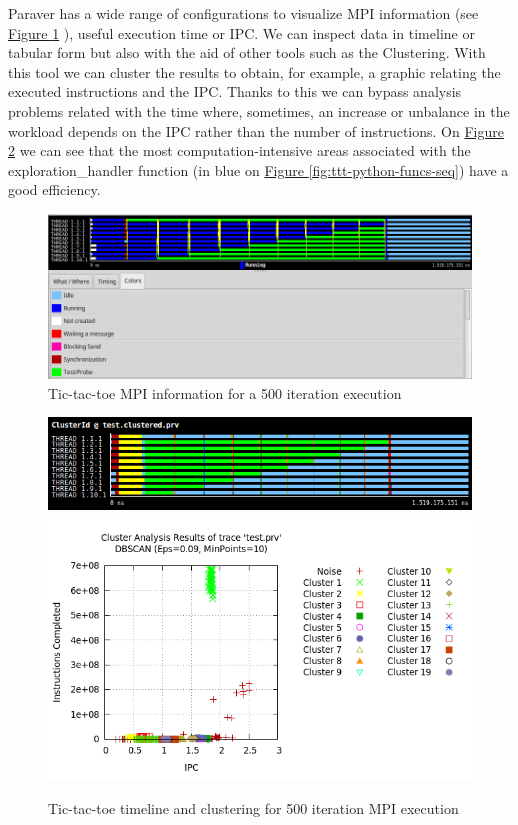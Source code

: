 Paraver has a wide range of configurations to visualize MPI information (see \hyperref[fig:fig:ttt-mpi-IPC]{Figure \ref{fig:ttt-mpi}} ), useful execution time or IPC. We can inspect data in timeline or tabular form but also with the aid of other tools such as the Clustering. With this tool we can cluster the results to obtain, for example, a graphic relating the executed instructions and the IPC. Thanks to this we can bypass analysis problems related with the time where, sometimes, an increase or unbalance in the workload depends on the IPC rather than the number of instructions. On \hyperref[fig:fig:ttt-mpi-IPC]{Figure \ref{fig:ttt-mpi-IPC}} we can see that the most computation-intensive areas associated with the exploration\_handler function (in blue on  \hyperref[fig:ttt-python-funcs-seq]{Figure \ref{fig:ttt-python-funcs-seq}}) have a good efficiency. 
 
 
\begin{figure}[h]
\includegraphics[width=\textwidth]{img/New_window_1_2DZoom_range_[1,6]@test.png}
\caption{Tic-tac-toe MPI information for a 500 iteration execution}
\label{fig:ttt-mpi}
\end{figure}


 
\begin{figure}[h]
\includegraphics[width=\textwidth]{img/cluster_graph_mpi.png}
\includegraphics[width=\textwidth]{img/cluster_mpi_IPC.png}
\caption{Tic-tac-toe timeline and clustering for 500 iteration MPI execution}
\label{fig:ttt-mpi-IPC}
\end{figure}



